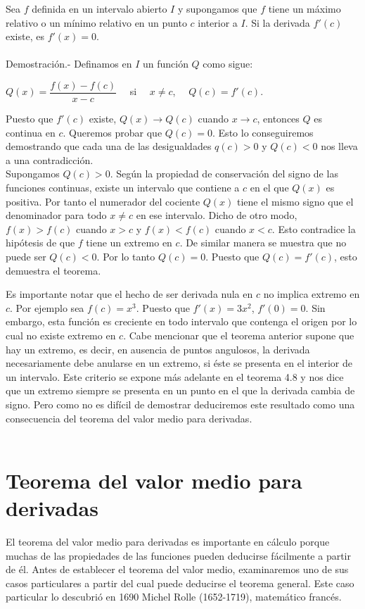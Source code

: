 \begin{teo}
    Sea $f$ definida en un intervalo abierto $I$ y supongamos que $f$ tiene un máximo relativo o un mínimo relativo en un punto $c$ interior a $I$. Si la derivada $f'(c)$ existe, es $f'(x)=0$.\\\\
	Demostración.-\; Definamos en $I$ un función $Q$ como sigue:
	\begin{center}
	    $Q(x)=\dfrac{f(x)-f(c)}{x-c}\quad$ si $\quad x\neq c$, $\quad Q(c)=f'(c).$
	\end{center}
	Puesto que $f'(c)$ existe, $Q(x)\to Q(c)$ cuando $x\to c$, entonces $Q$ es continua en $c$. Queremos probar que $Q(c)=0$. Esto lo conseguiremos demostrando que cada una de las desigualdades $q(c)>0$ y $Q(c)<0$ nos lleva a una contradicción.\\
	Supongamos $Q(c)>0$. Según la propiedad de conservación del signo de las funciones continuas, existe un intervalo que contiene a $c$ en el que $Q(x)$ es positiva. Por tanto el numerador del cociente $Q(x)$ tiene el mismo signo que el denominador para todo $x\neq c$ en ese intervalo. Dicho de otro modo, $f(x)>f(c)$ cuando $x>c$ y $f(x)<f(c)$ cuando $x<c$. Esto contradice la hipótesis de que $f$ tiene un extremo en $c$. De similar manera se muestra que no puede ser $Q(c)<0.$ Por lo tanto $Q(c)=0$. Puesto que $Q(c)=f'(c)$, esto demuestra el teorema.\\
\end{teo}

Es importante notar que el hecho de ser derivada nula en $c$ no implica extremo en $c$. Por ejemplo sea $f(c)=x^3$. Puesto que $f'(x)=3x^2$, $f'(0)=0$. Sin embargo, esta función es creciente en todo intervalo que contenga el origen por lo cual no existe extremo en $c$. Cabe mencionar que el teorema anterior supone que hay un extremo, es decir, en ausencia de puntos angulosos, la derivada necesariamente debe anularse en un extremo, si éste se presenta en el interior de un intervalo. Este criterio se expone más adelante en el teorema 4.8 y nos dice que un extremo siempre se presenta en un punto en el que la derivada cambia de signo. Pero como no es difícil de demostrar deduciremos este resultado como una consecuencia del teorema del valor medio para derivadas.\\\\

\section{Teorema del valor medio para derivadas}
El teorema del valor medio para derivadas es importante en cálculo porque muchas de las propiedades de las funciones pueden deducirse fácilmente a partir de él. Antes de establecer el teorema del valor medio, examinaremos uno de sus casos particulares a partir del cual puede deducirse el teorema general. Este caso particular lo descubrió en 1690 Michel Rolle (1652-1719), matemático francés.\\

